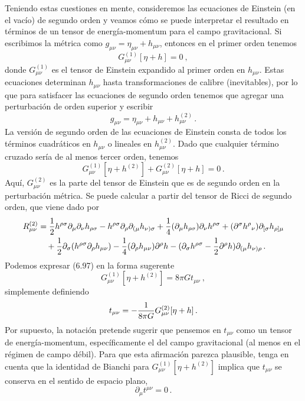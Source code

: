 \documentclass[11pt,b5paper,openany,twoside]{book}
\newcommand{\mn}{{\mu\nu}}
\newcommand{\p}[1]{{\partial_{#1}}}
\begin{document}
Teniendo estas cuestiones en mente, consideremos las ecuaciones de Einstein (en el vacío) de segundo orden y veamos cómo se puede interpretar el resultado en términos de un tensor de energía-momentum para el campo gravitacional.
Si escribimos la métrica como $g_\mn = \eta_\mn + h_\mn$, entonces en el primer orden tenemos
\begin{equation}
G^{(1)}_\mn[\eta+h] = 0\ ,\label{6.95}
\end{equation}
donde $G^{(1)}_\mn$ es el tensor de Einstein expandido al primer orden en $h_\mn$.
Estas ecuaciones determinan $h_\mn$ hasta transformaciones de calibre (inevitables), por lo que para satisfacer las ecuaciones de segundo orden tenemos que agregar una perturbación de orden superior y escribir
\begin{equation}
g_\mn = \eta_\mn + h_\mn + h^{(2)}_\mn\,.\label{6.96}
\end{equation}
La versión de segundo orden de las ecuaciones de Einstein consta de todos los términos cuadráticos en $h_\mn$ o lineales en $h^{(2)}_\mn$.
Dado que cualquier término cruzado sería de al menos tercer orden, tenemos
\begin{equation}
G^{(1)}_\mn[\eta+h^{(2)}] +G^{(2)}_\mn[\eta+h] =0\,.
\label{6.97}
\end{equation}
Aquí, $G^{(2)}_\mn$ es la parte del tensor de Einstein que es de segundo orden en la perturbación métrica.
Se puede calcular a partir del tensor de Ricci de segundo orden, que viene dado por
\begin{align}
R^{(2)}_\mn  &=  {1\over 2}h^{\rho\sigma}\p\mu
\p\nu h_{\rho\sigma} - h^{\rho\sigma}\p\rho\p{(\mu}
h_{\nu)\sigma} +{1\over 4}(\p\mu h_{\rho\sigma})\p\nu
h^{\rho\sigma} +(\partial^\sigma h^\rho{}_\nu)
\p{[\sigma}h_{\rho]\mu}  \notag \\
&\quad +{1\over 2}\p\sigma(h^{\rho\sigma}\p\rho h_\mn)
-{1\over 4}(\p\rho h_\mn)\partial^\rho h - (\p\sigma
h^{\rho\sigma} -{1\over 2}\partial^\rho h)\p{(\mu}
h_{\nu)\rho}\,. \label{6.98}
\end{align}
Podemos expresar (6.97) en la forma sugerente
\begin{equation}
G^{(1)}_\mn[\eta+h^{(2)}] = 8\pi G t_\mn \ ,\label{6.99}
\end{equation}
simplemente definiendo
\begin{equation}
t_\mn = -{1\over {8\pi G}}G^{(2)}_\mn[\eta+h]\,.\label{6.100}
\end{equation}
Por supuesto, la notación pretende sugerir que pensemos en $t_\mn$ como un tensor de energía-momentum, específicamente el del campo gravitacional (al menos en el régimen de campo débil).
Para que esta afirmación parezca plausible, tenga en cuenta que la identidad de Bianchi para $G^{(1)}_\mn[\eta+h^{(2)}]$ implica que $t_\mn$ se conserva en el sentido de espacio plano,
\begin{equation}
\p\mu t^\mn =0\,.\label{6.101}
\end{equation}
\end{document}
